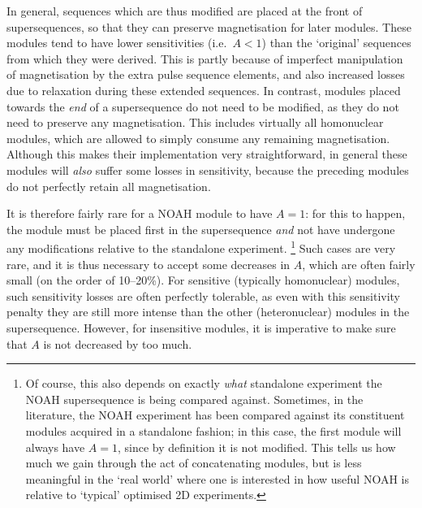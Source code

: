 In general, sequences which are thus modified are placed at the front of supersequences, so that they can preserve magnetisation for later modules.
These modules tend to have lower sensitivities (i.e.\ $A < 1$) than the `original' sequences from which they were derived.
This is partly because of imperfect manipulation of magnetisation by the extra pulse sequence elements, and also increased losses due to relaxation during these extended sequences.
In contrast, modules placed towards the \textit{end} of a supersequence do not need to be modified, as they do not need to preserve any magnetisation.
This includes virtually all homonuclear modules, which are allowed to simply consume any remaining magnetisation.
Although this makes their implementation very straightforward, in general these modules will \textit{also} suffer some losses in sensitivity, because the preceding modules do not perfectly retain all magnetisation.

It is therefore fairly rare for a NOAH module to have $A = 1$: for this to happen, the module must be placed first in the supersequence \textit{and} not have undergone any modifications relative to the standalone experiment.%
\footnote{Of course, this also depends on exactly \textit{what} standalone experiment the NOAH supersequence is being compared against. Sometimes, in the literature, the NOAH experiment has been compared against its constituent modules acquired in a standalone fashion; in this case, the first module will always have $A = 1$, since by definition it is not modified. This tells us how much we gain through the act of concatenating modules, but is less meaningful in the `real world' where one is interested in how useful NOAH is relative to `typical' optimised 2D experiments.}
Such cases are very rare, and it is thus necessary to accept some decreases in $A$, which are often fairly small (on the order of 10--20\%).
For sensitive (typically homonuclear) modules, such sensitivity losses are often perfectly tolerable, as even with this sensitivity penalty they are still more intense than the other (heteronuclear) modules in the supersequence.
However, for insensitive modules, it is imperative to make sure that $A$ is not decreased by too much.

